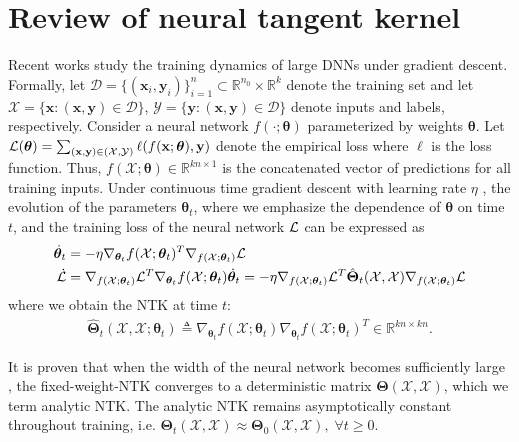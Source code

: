 \documentclass{article} %
\begin{document}
\section{Review of neural tangent kernel} \label{sect:relatedwork-NTK}
Recent works \citep{jacot2018ntk, lee2019wide, arora2019exact, xiao2020disentangling} study the training dynamics of large DNNs under gradient descent. 
Formally, let $\mathcal{D} =\{(\mathbf{x}_i,\mathbf{y}_i)\}_{i=1}^{n} \subset \mathbb{R}^{n_0} \times \mathbb{R}^{k}$ denote the training set and let $\mathcal{X} = \{\mathbf{x}:(\mathbf{x},\mathbf{y}) \in \mathcal{D}\}$, $ \mathcal{Y} = \{\mathbf{y}:(\mathbf{x},\mathbf{y}) \in \mathcal{D}\}$ denote inputs and labels, respectively. Consider a neural network $f(\cdot;\boldsymbol{\theta})$ parameterized by weights $\boldsymbol{\theta}$. Let $\mathcal{L}(\boldsymbol{\theta})=\sum_{(\mathbf{x},\mathbf{y}) \in (\mathcal{X}, \mathcal{Y})} \ell(f(\mathbf{x};\boldsymbol{\theta}),\mathbf{y})$ denote the empirical loss where $\ell$ is the loss function. Thus, $f(\mathcal{X};\boldsymbol{\theta}) \in \mathbb{R}^{kn \times 1}$ is the concatenated vector of predictions for all training inputs. Under continuous time gradient descent with learning rate $\eta$ , the evolution of the parameters $\boldsymbol{\theta}_t$, where we emphasize the dependence of $\boldsymbol{\theta}$ on time $t$, and the training loss of the neural network $\mathcal{L}$ can be expressed \citep{lee2019wide} as
\begin{align}
    \dot{\boldsymbol{\theta}}_t&=-\eta \nabla_{\boldsymbol{\theta}_t}f(\mathcal{X};\boldsymbol{\theta}_t)^T \nabla_{f(\mathcal{X};\boldsymbol{\theta}_t)}\mathcal{L} \\
    \dot{\mathcal{L}} &= \nabla_{f(\mathcal{X};\boldsymbol{\theta}_t)}\mathcal{L} ^{T}\nabla_{\boldsymbol{\theta}_t}f(\mathcal{X};\boldsymbol{\theta}_t) \dot{\boldsymbol{\theta}}_t = -\eta \nabla_{f(\mathcal{X};\boldsymbol{\theta}_t)}\mathcal{L} ^{T} \hat{\boldsymbol{\Theta}}_t(\mathcal{X},\mathcal{X}) \nabla_{f(\mathcal{X};\boldsymbol{\theta}_t)}\mathcal{L}
\end{align}
where we obtain the NTK at time $t$:
\begin{align}
    \hat{\boldsymbol{\Theta}}_t(\mathcal{X},\mathcal{X}; \boldsymbol{\theta}_t) \triangleq \nabla_{\boldsymbol{\theta}_t}f(\mathcal{X};\boldsymbol{\theta}_t) \nabla_{\boldsymbol{\theta}_t}f(\mathcal{X};\boldsymbol{\theta}_t)^T
    \in \mathbb{R}^{kn \times kn} .
\end{align}

It is proven that when the width of the neural network becomes sufficiently large \citep{jacot2018ntk, arora2019exact}, the fixed-weight-NTK converges to a deterministic matrix $\boldsymbol{\Theta}(\mathcal{X},\mathcal{X})$, which we term analytic NTK. The analytic NTK remains asymptotically constant throughout training, i.e. $\boldsymbol{\Theta}_t(\mathcal{X},\mathcal{X}) \approx  \boldsymbol{\Theta}_0(\mathcal{X},\mathcal{X}), \; \forall t \ge 0$. 
\end{document}
